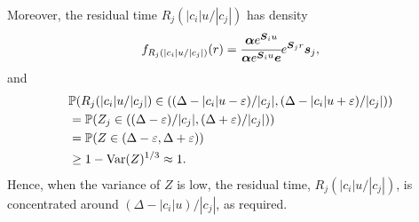 

Moreover, the residual time \(R_j(|c_i|u/|c_j|)\) has density 
\[f_{R_j(|c_i|u/|c_j|)}(r) = \cfrac{\boldsymbol\alpha e^{\boldsymbol S_iu } }{\boldsymbol\alpha e^{\boldsymbol S_iu } \boldsymbol e}e^{\boldsymbol S_j r}\boldsymbol s_j,\]
and 
\begin{align}
	&\mathbb P(R_j(|c_i|u/|c_j|) \in ((\Delta-|c_i|u-\varepsilon)/|c_j|, (\Delta-|c_i|u + \varepsilon)/|c_j| )) \nonumber
	\\&=\mathbb P(Z_j\in ((\Delta-\varepsilon)/|c_j|, (\Delta + \varepsilon)/|c_j|)) 
	\\&=\mathbb P(Z\in (\Delta-\varepsilon ,  \Delta + \varepsilon )) 
	\\&\geq 1-\mathrm{Var}(Z)^{1/3} \approx 1.
\end{align}
Hence, when the variance of \(Z\) is low, the residual time, \(R_j(|c_i|u/|c_j|)\), is concentrated around \((\Delta - |c_i|u)/|c_j|\), as required. 


